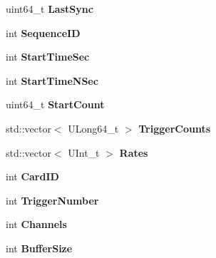 \begin{DoxyCompactItemize}
\item 
\hypertarget{classCardData_a68649c499d7610955e7a9b143142e224}{
uint64\_\-t {\bfseries LastSync}}
\label{classCardData_a68649c499d7610955e7a9b143142e224}

\item 
\hypertarget{classCardData_a4fdf5313faebd27fee17096a31d0e28e}{
int {\bfseries SequenceID}}
\label{classCardData_a4fdf5313faebd27fee17096a31d0e28e}

\item 
\hypertarget{classCardData_a1297c0ccdeb5cb134cef3c92e01a36ed}{
int {\bfseries StartTimeSec}}
\label{classCardData_a1297c0ccdeb5cb134cef3c92e01a36ed}

\item 
\hypertarget{classCardData_af5393836942c9d857039e8b11bac2952}{
int {\bfseries StartTimeNSec}}
\label{classCardData_af5393836942c9d857039e8b11bac2952}

\item 
\hypertarget{classCardData_a7bd1f3c2269b6c7d3f12ffdd59efa1e6}{
uint64\_\-t {\bfseries StartCount}}
\label{classCardData_a7bd1f3c2269b6c7d3f12ffdd59efa1e6}

\item 
\hypertarget{classCardData_a816053ce45a07b8f7a7e5bfd914c51db}{
std::vector$<$ ULong64\_\-t $>$ {\bfseries TriggerCounts}}
\label{classCardData_a816053ce45a07b8f7a7e5bfd914c51db}

\item 
\hypertarget{classCardData_ab44adb08a1c2de7f4d24463325c87934}{
std::vector$<$ UInt\_\-t $>$ {\bfseries Rates}}
\label{classCardData_ab44adb08a1c2de7f4d24463325c87934}

\item 
\hypertarget{classCardData_a36cb9c0f73fcf5eae251e0a2b1b2bd0f}{
int {\bfseries CardID}}
\label{classCardData_a36cb9c0f73fcf5eae251e0a2b1b2bd0f}

\item 
\hypertarget{classCardData_a6307217de93243eb7b0aa9931f02f706}{
int {\bfseries TriggerNumber}}
\label{classCardData_a6307217de93243eb7b0aa9931f02f706}

\item 
\hypertarget{classCardData_a98f397c0dd49007942f5f25c8cbc67f0}{
int {\bfseries Channels}}
\label{classCardData_a98f397c0dd49007942f5f25c8cbc67f0}

\item 
\hypertarget{classCardData_a82c5fd806c6529cf7a9625dc262f9e8d}{
int {\bfseries BufferSize}}
\label{classCardData_a82c5fd806c6529cf7a9625dc262f9e8d}


\end{DoxyCompactItemize}
